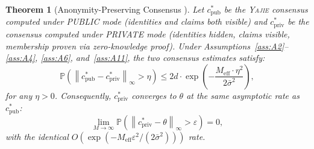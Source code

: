 \documentclass[11pt,a4paper]{article}
\newtheorem{theorem}{Theorem}[section]
\theoremstyle{definition}
\newcommand{\Yajie}{\textsc{Yajie}}
\newcommand{\Pbb}{\mathbb{P}}
\newcommand{\norm}[1]{\left\lVert#1\right\rVert}
\newcommand{\VISpublic}{\textsc{PUBLIC}}
\newcommand{\VISprivate}{\textsc{PRIVATE}}
\begin{document}
\begin{theorem}[Anonymity-Preserving Consensus ]
\label{thm:anonymity}
Let $c^*_{\mathrm{pub}}$ be the \Yajie{} consensus computed under \VISpublic{} mode (identities and claims both visible) and $c^*_{\mathrm{priv}}$ be the consensus computed under \VISprivate{} mode (identities hidden, claims visible, membership proven via zero-knowledge proof). Under Assumptions~\ref{ass:A2}--\ref{ass:A4}, \ref{ass:A6}, and~\ref{ass:A11}, the two consensus estimates satisfy:
\begin{equation}
    \Pbb\left(\norm{c^*_{\mathrm{pub}} - c^*_{\mathrm{priv}}}_\infty > \eta\right) \leq 2d \cdot \exp\left(-\frac{M_{\mathrm{eff}} \cdot \eta^2}{2\bar{\sigma}^2}\right),
    \label{eq:pub_priv_agreement}
\end{equation}
for any $\eta > 0$. Consequently, $c^*_{\mathrm{priv}}$ converges to $\theta$ at the same asymptotic rate as $c^*_{\mathrm{pub}}$:
\begin{equation}
    \lim_{M \to \infty} \Pbb\left(\norm{c^*_{\mathrm{priv}} - \theta}_\infty > \varepsilon\right) = 0,
    \label{eq:priv_convergence}
\end{equation}
with the identical $O(\exp(-M_{\mathrm{eff}} \varepsilon^2 / (2\bar{\sigma}^2)))$ rate.
\end{theorem}
\end{document}
